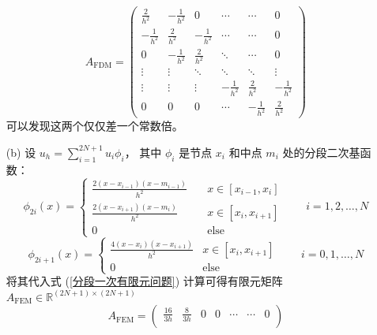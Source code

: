 \documentclass[a4paper]{article}
\begin{document}
\begin{enumerate}
\begin{equation}
                A_{\text{FDM}} = 
                \begin{pmatrix}
                    \frac{2}{h^2} & -\frac{1}{h^2} & 0 & \cdots & \cdots & 0\\
                    -\frac{1}{h^2} & \frac{2}{h^2} & -\frac{1}{h^2} & \cdots & \cdots & 0\\
                    0 & -\frac{1}{h^2} & \frac{2}{h^2} & \ddots & \cdots & 0\\
                    \vdots & \vdots & \ddots & \ddots & \ddots & \vdots\\
                    \vdots & \vdots & \vdots & -\frac{1}{h^2} & \frac{2}{h^2} & -\frac{1}{h^2}\\
                    0 & 0 & 0 & \cdots & -\frac{1}{h^2} & \frac{2}{h^2}
                \end{pmatrix}
            \end{equation}
            可以发现这两个仅仅差一个常数倍。
    \item[(b)] 设 $u_h=\sum_{i=1}^{2N+1}u_i\phi_i$，
                其中 $\phi_i$ 是节点 $x_i$ 和中点 $m_i$ 处的分段二次基函数：
            \begin{equation}
                \phi_{2i}(x) = \begin{cases}
                    \displaystyle\frac{2(x-x_{i-1})(x-m_{i-1})}{h^2} \quad & x\in [x_{i-1}, x_i] \\
                    \displaystyle\frac{2(x-x_{i+1})(x-m_i)}{h^2} & x\in [x_i, x_{i+1}] \\
                    0 & \text{else}
                \end{cases}
                \qquad i=1,2,\ldots,N
            \end{equation}
            \begin{equation}
                \phi_{2i+1}(x) = \begin{cases}
                    \displaystyle\frac{4(x-x_{i})(x-x_{i+1})}{h^2} & x\in [x_i, x_{i+1}] \\
                    0 & \text{else}
                \end{cases}
                \qquad i=0,1,\ldots,N
            \end{equation}
            将其代入式 (\ref{分段一次有限元问题}) 计算可得有限元矩阵
            $A_{\text{FEM}} \in \mathbb{R}^{(2N+1)\times (2N+1)}$
            \begin{equation}
                A_{\text{FEM}} =
                \begin{pmatrix}
                    \frac{16}{3h} & \frac{8}{3h} & 0 & 0 & \cdots & \cdots & 0\\

\end{pmatrix}
\end{equation}
\end{enumerate}
\end{document}
